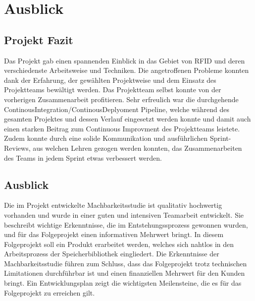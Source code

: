 \chapter{Ausblick}
\label{ch:Ausblick}

\section{Projekt Fazit}
Das Projekt gab einen spannenden Einblick in das Gebiet von RFID und deren verschiedenste Arbeitsweise und Techniken. Die angetroffenen Probleme konnten dank der Erfahrung, der gewählten Projektweise und dem Einsatz des Projektteams bewältigt werden. Das Projektteam selbst konnte von der vorherigen Zusammenarbeit profitieren. Sehr erfreulich war die durchgehende ContinousIntegration/ContinousDeplyoment Pipeline, welche während des gesamten Projektes und dessen Verlauf eingesetzt werden konnte und damit auch einen starken Beitrag zum Continuous Improvment des Projektteams leistete. Zudem konnte durch eine solide Kommunikation und ausführlichen Sprint-Reviews, aus welchen Lehren gezogen werden konnten, das Zusammenarbeiten des Teams in jedem Sprint etwas verbessert werden.

\section{Ausblick}
Die im Projekt entwickelte Machbarkeitsstudie ist qualitativ hochwertig vorhanden und wurde in einer guten und intensiven Teamarbeit entwickelt. Sie beschreibt wichtige Erkenntnisse, die im Entstehungssprozess gewonnen wurden, und für das Folgeprojekt einen informativen Mehrwert bringt. In diesem Folgeprojekt soll ein Produkt erarbeitet werden, welches sich nahtlos in den Arbeitsprozess der Speicherbibliothek eingliedert. Die Erkenntnisse der Machbarkeitsstudie führen zum Schluss, dass das Folgeprojekt trotz technischen Limitationen durchführbar ist und einen finanziellen Mehrwert für den Kunden bringt. Ein Entwicklungsplan zeigt die wichtigsten Meilensteine, die es für das Folgeprojekt zu erreichen gilt.

